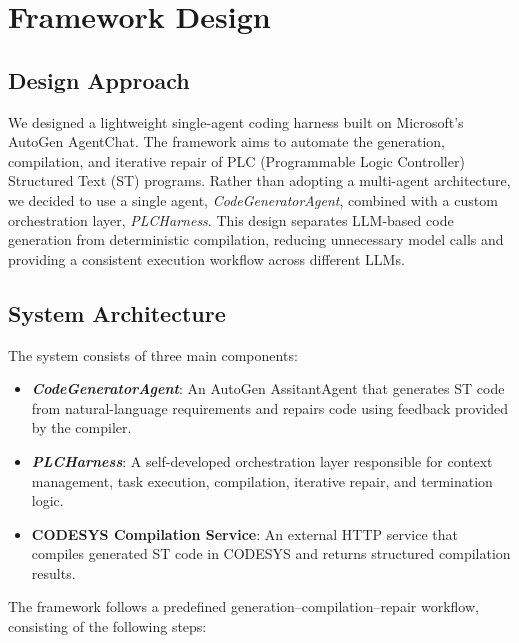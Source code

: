 \documentclass{article}
\begin{document}
\section{Framework Design}

\subsection{Design Approach}

We designed a lightweight single-agent coding harness built on Microsoft's AutoGen AgentChat. The framework aims to automate the generation, compilation, and iterative repair of PLC (Programmable Logic Controller) Structured Text (ST) programs. Rather than adopting a multi-agent architecture, we decided to use a single agent, \textit{CodeGeneratorAgent}, combined with a custom orchestration layer, \textit{PLCHarness}. This design separates LLM-based code generation from deterministic compilation, reducing unnecessary model calls and providing a consistent execution workflow across different LLMs.

\subsection{System Architecture}

The system consists of three main components:

\begin{itemize}
\item \textbf{\textit{CodeGeneratorAgent}}: An AutoGen AssitantAgent that generates ST code from natural-language requirements and repairs code using feedback provided by the compiler.
\item \textbf{\textit{PLCHarness}}: A self-developed orchestration layer responsible for context management, task execution, compilation, iterative repair, and termination logic.
\item \textbf{CODESYS Compilation Service}: An external HTTP service that compiles generated ST code in CODESYS and returns structured compilation results.
\end{itemize}

The framework follows a predefined generation–compilation–repair workflow, consisting of the following steps:
\end{document}
